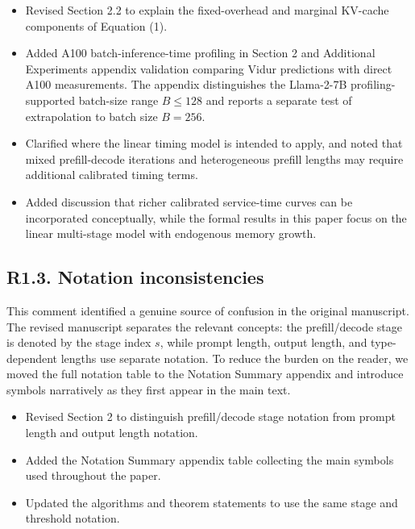 \changes
\begin{itemize}
    \item Revised Section 2.2 to explain the fixed-overhead and marginal KV-cache components of Equation (1).
    \item Added A100 batch-inference-time profiling in Section 2 and Additional Experiments appendix validation comparing Vidur predictions with direct A100 measurements. The appendix distinguishes the Llama-2-7B profiling-supported batch-size range \(B\le128\) and reports a separate test of extrapolation to batch size \(B=256\).
    \item Clarified where the linear timing model is intended to apply, and noted that mixed prefill-decode iterations and heterogeneous prefill lengths may require additional calibrated timing terms.
    \item Added discussion that richer calibrated service-time curves can be incorporated conceptually, while the formal results in this paper focus on the linear multi-stage model with endogenous memory growth.
\end{itemize}

\subsection*{R1.3. Notation inconsistencies}


\response This comment identified a genuine source of confusion in the original manuscript. The revised manuscript separates the relevant concepts: the prefill/decode stage is denoted by the stage index \(s\), while prompt length, output length, and type-dependent lengths use separate notation. To reduce the burden on the reader, we moved the full notation table to the Notation Summary appendix and introduce symbols narratively as they first appear in the main text.

\changes
\begin{itemize}
    \item Revised Section 2 to distinguish prefill/decode stage notation from prompt length and output length notation.
    \item Added the Notation Summary appendix table collecting the main symbols used throughout the paper.
    \item Updated the algorithms and theorem statements to use the same stage and threshold notation.
\end{itemize}


